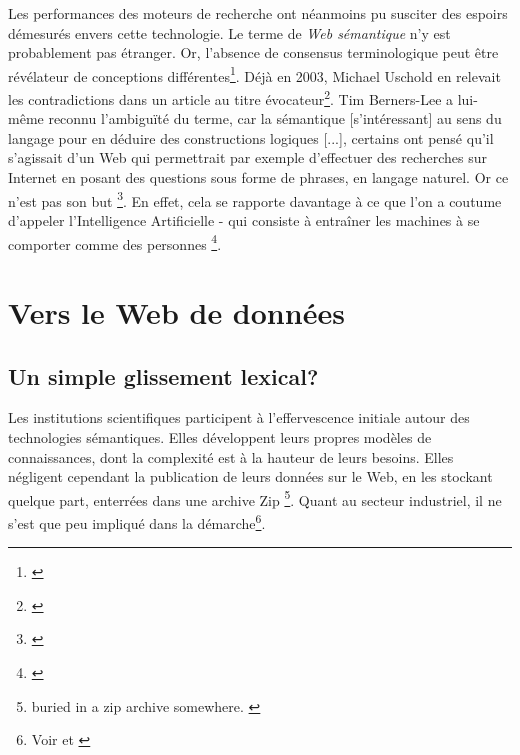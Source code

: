 \documentclass[a4paper,12pt,twoside]{book}
\begin{document}
Les performances des moteurs de recherche ont néanmoins pu susciter des espoirs démesurés envers cette technologie. Le terme de \textit{Web sémantique} n'y est probablement pas étranger. Or, l'absence de consensus terminologique peut être révélateur de conceptions différentes\footnote{\cite[p.~22]{amarBienvenueDansGigantesque2011}}. Déjà en 2003, Michael Uschold en relevait les contradictions dans un article au titre évocateur\footnote{\cite[p.~26]{uscholdWhereAreSemantics2003}}. Tim Berners-Lee a lui-même reconnu l'ambiguïté du terme, car \og la sémantique [s'intéressant] au sens du langage pour en déduire des constructions logiques [...], certains ont pensé qu'il s'agissait d'un Web qui permettrait par exemple d'effectuer des recherches sur Internet en posant des questions sous forme de phrases, en langage naturel. Or ce n'est pas son but \fg\footnote{\cite{berners-leeWebChangeDimension2019}}. En effet, cela se rapporte davantage à ce que l'on a coutume d'appeler l'Intelligence Artificielle - qui consiste à \og entraîner les machines à se comporter comme des personnes \fg\footnote{\cite{berners-leeSemanticWebRoad1998}}.\\


\section{Vers le Web de données}
\subsection{Un simple glissement lexical?}
Les institutions scientifiques participent à l'effervescence initiale autour des technologies sémantiques. Elles développent leurs propres modèles de connaissances, dont la complexité est à la hauteur de leurs besoins. Elles négligent cependant la publication de leurs données sur le Web, en les stockant \og quelque part, enterrées dans une archive Zip \fg{} \footnote{\og buried in a zip archive somewhere\fg. \cite{berners-leeLinkedData2006}}. Quant au secteur industriel, il ne s'est que peu impliqué dans la démarche\footnote{Voir \cite[p.~37-38]{bermesWebSemantiqueBibliotheque2013} et \cite{poupeauBilan15Ans2016}}.\\
\end{document}
